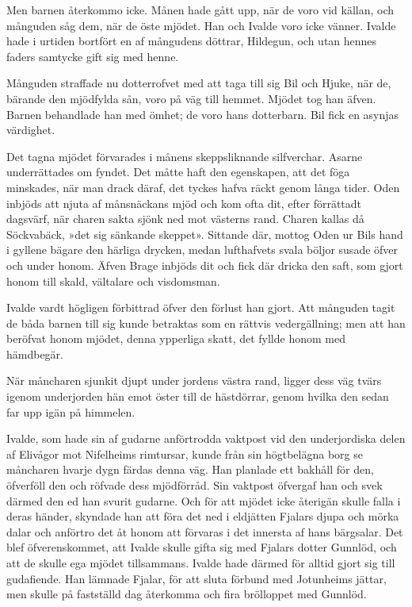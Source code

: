 Men barnen återkommo icke. Månen hade gått upp, när de voro vid källan,
och månguden såg dem, när de öste mjödet. Han och Ivalde voro icke
vänner. Ivalde hade i
urtiden bortfört en af mångudens döttrar, Hildegun, och utan hennes
faders samtycke gift sig med henne.

Månguden straffade nu dotterrofvet med att taga till sig Bil och Hjuke,
när de, bärande den mjödfylda sån, voro på väg till hemmet. Mjödet tog
han äfven. Barnen behandlade han med ömhet; de voro hans dotterbarn. Bil
fick en asynjas värdighet.

Det tagna mjödet förvarades i månens skeppsliknande silfverchar. Asarne
underrättades om fyndet. Det måtte haft den egenskapen, att det föga
minskades, när man drack däraf, det tyckes hafva räckt genom långa
tider. Oden inbjöds att njuta af månsnäckans mjöd och kom ofta dit,
efter förrättadt dagsvärf, när charen sakta sjönk ned mot västerns rand.
Charen kallas då Söckvabäck, »det sig sänkande skeppet». Sittande där,
mottog Oden ur Bils hand i gyllene bägare den härliga drycken, medan
lufthafvets svala böljor susade öfver och under honom. Äfven Brage
inbjöds dit och fick där dricka den saft, som gjort honom till skald,
vältalare och visdomsman.

Ivalde vardt högligen förbittrad öfver den förlust han gjort. Att
månguden tagit de båda barnen till sig kunde betraktas som en rättvis
vedergällning; men att han beröfvat honom mjödet, denna ypperliga skatt,
det fyllde honom med hämdbegär.

När måncharen sjunkit djupt under jordens västra rand, ligger dess väg
tvärs igenom underjorden hän emot öster till de hästdörrar, genom hvilka
den sedan far upp igän på himmelen.

Ivalde, som hade sin af gudarne anförtrodda vaktpost vid den
underjordiska delen af Elivågor mot Nifelheims rimtursar, kunde från sin
högtbelägna borg se måncharen hvarje dygn färdas denna väg. Han planlade
ett bakhåll för den, öfverföll den och röfvade dess mjödförråd. Sin
vaktpost öfvergaf han och svek därmed den ed han svurit gudarne. Och för
att mjödet icke återigän skulle falla i deras händer, skyndade han att
föra det ned i eldjätten Fjalars djupa och mörka
dalar och anförtro det åt honom att förvaras i det innersta af hans
bärgsalar. Det blef öfverenskommet, att Ivalde skulle gifta sig med
Fjalars dotter Gunnlöd, och att de skulle ega mjödet tillsammans. Ivalde
hade därmed för alltid gjort sig till gudafiende. Han lämnade Fjalar,
för att sluta förbund med Jotunheims jättar, men skulle på fastställd
dag återkomma och fira brölloppet med Gunnlöd.

